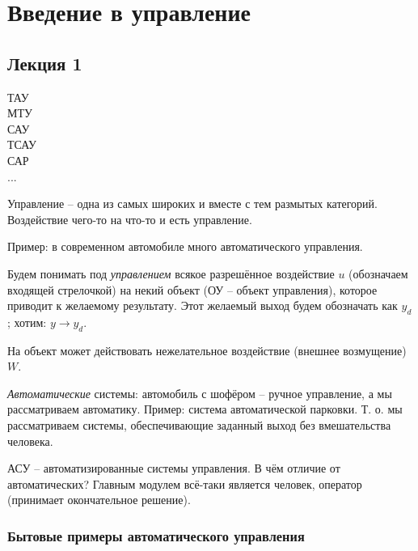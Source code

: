 \documentclass[main.tex]{subfiles}
\begin{document}
\chapter{Введение в управление}

\section{ Лекция 1 }

ТАУ \\
МТУ \\
САУ \\
ТСАУ \\
САР \\
...

Управление -- одна из самых широких и вместе с тем размытых категорий. Воздействие чего-то на что-то и есть управление.

Пример: в современном автомобиле много автоматического управления.

Будем понимать под \emph{управлением} всякое разрешённое воздействие $ u $ (обозначаем входящей стрелочкой) на некий объект (ОУ -- объект управления), которое приводит к желаемому результату.
Этот желаемый выход будем обозначать как $ y_d $; хотим: $ y \to y_d $.

На объект может действовать нежелательное воздействие (внешнее возмущение) $ W $.

\emph{Автоматические} системы: автомобиль с шофёром -- ручное управление, а мы рассматриваем автоматику.
Пример: система автоматической парковки. Т. о. мы рассматриваем системы, обеспечивающие заданный выход без вмешательства человека.

АСУ -- автоматизированные системы управления.
В чём отличие от автоматических?
Главным модулем всё-таки является человек, оператор (принимает окончательное решение).

\subsection{Бытовые примеры автоматического управления}
\end{document}
